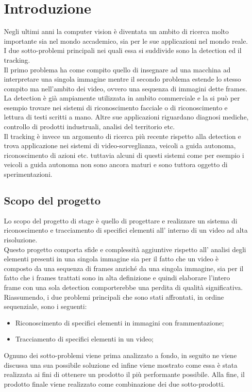 \section{Introduzione}
Negli ultimi anni la computer vision è diventata un ambito di ricerca molto importante sia nel mondo accademico, sia per le sue applicazioni nel mondo reale. I due sotto-problemi principali nei quali essa si suddivide sono la detection ed il tracking.\\
Il primo problema ha come compito quello di insegnare ad una macchina ad interpretare una singola immagine mentre il secondo problema estende lo stesso compito ma nell'ambito dei video, ovvero una sequenza di immagini dette frames. La detection è già ampiamente utilizzata in ambito commerciale e la si può per esempio trovare nei sistemi di riconoscimento facciale o di riconoscimento e lettura di testi scritti a mano. Altre sue applicazioni riguardano diagnosi mediche, controllo di prodotti industruali, analisi del territorio etc.\\ 
Il tracking è invece un argomento di ricerca più recente rispetto alla detection e trova applicazione nei sistemi di video-sorveglianza, veicoli a guida autonoma, riconoscimento di azioni etc. tuttavia alcuni di questi sistemi come per esempio i veicoli a guida autonoma non sono ancora maturi e sono tuttora oggetto di sperimentazioni.
\subsection{Scopo del progetto}
Lo scopo del progetto di stage è quello di progettare e realizzare un sistema di riconoscimento e tracciamento di specifici elementi all' interno di un video ad alta risoluzione.\\
Questo progetto comporta sfide e complessità aggiuntive rispetto all' analisi degli elementi presenti in una singola immagine sia per il fatto che un video è composto da una sequenza di frames anziché da una singola immagine, sia per il fatto che i frames trattati sono in alta definizione e quindi elaborare l'intero frame con una sola detection comporterebbe una perdita di qualità significativa.\\
Riassumendo, i due problemi principali che sono stati affrontati, in ordine sequenziale, sono i seguenti:
\begin{itemize}
\item Riconoscimento di specifici elementi in immagini con frammentazione;
\item Tracciamento di specifici elementi in un video;
\end{itemize}
Ognuno dei sotto-problemi viene prima analizzato a fondo, in seguito ne viene discussa una sua possibile soluzione ed infine viene mostrato come essa è stata realizzata ai fini di ottenere un prodotto il più performante possibile.
Alla fine, il prodotto finale viene realizzato come combinazione dei due sotto-prodotti.

